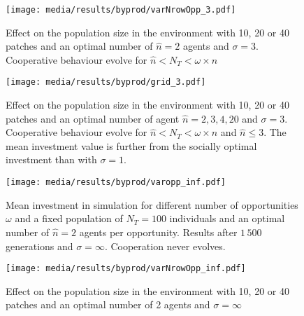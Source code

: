 \documentclass[twocolumn]{article}
\begin{document}
\begin{figure*}
    \centering
    \texttt{[image: media/results/byprod/varNrowOpp\_3.pdf]}
    \caption{Effect on the population size in the environment with 10, 20 or 40 patches and an optimal number of $\hat{n} = 2$ agents and $\sigma = 3$. Cooperative behaviour evolve for $\hat{n} < N_T < \omega\times \hat{n}$}
    \label{fig:varNrowOpptol3}
\end{figure*}

\begin{figure*}
    \centering
    \texttt{[image: media/results/byprod/grid\_3.pdf]}
    \caption{Effect on the population size in the environment with 10, 20 or 40 patches and an optimal number of agent $\hat{n} = 2, 3, 4, 20$ and $\sigma = 3$. Cooperative behaviour evolve for $\hat{n} < N_T < \omega\times \hat{n}$ and $\hat{n} \leq 3$. The mean investment value is further from the socially optimal investment than with $\sigma = 1$.}
    \label{fig:gridtol3}
\end{figure*}


\begin{figure}[htbp]
    \centering
    \texttt{[image: media/results/byprod/varopp\_inf.pdf]}
    \caption{Mean investment in simulation for different number of opportunities $\omega$ and a fixed population of $N_T=100$ individuals and an optimal number of $\hat{n} = 2$ agents per opportunity. Results after $1\,500$ generations and $\sigma = \infty$. Cooperation never evolves.}

    \label{fig:varyingopptolinf}
\end{figure}

\begin{figure*}
    \centering
    \texttt{[image: media/results/byprod/varNrowOpp\_inf.pdf]}
    \caption{Effect on the population size in the environment with 10, 20 or 40 patches and an optimal number of 2 agents and $\sigma = \infty$}
    \label{fig:varNrowOpptolinf}
\end{figure*}
\end{document}
